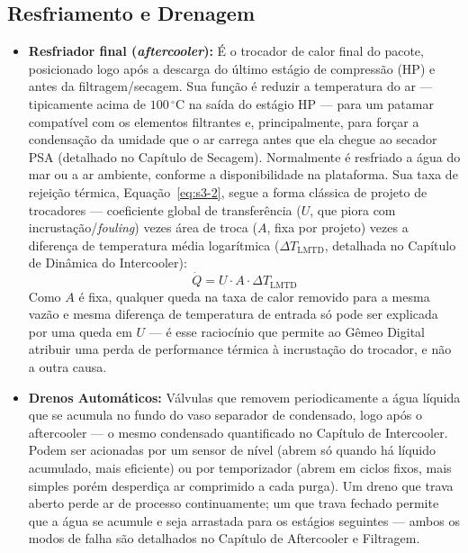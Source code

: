 \documentclass[12pt,a4paper]{article}
\numberwithin{equation}{section}
\numberwithin{table}{section}
\numberwithin{figure}{section}
\begin{document}
{	\subsection{\textbf{Resfriamento e Drenagem}}
	\begin{itemize}
		\item \textbf{Resfriador final (\textit{aftercooler}):} É o trocador de calor final do pacote, posicionado logo após a descarga do último estágio de compressão (HP) e antes da filtragem/secagem. Sua função é reduzir a temperatura do ar — tipicamente acima de $100\,^{\circ}\text{C}$ na saída do estágio HP — para um patamar compatível com os elementos filtrantes e, principalmente, para forçar a condensação da umidade que o ar carrega antes que ela chegue ao secador PSA (detalhado no Capítulo de Secagem). Normalmente é resfriado a água do mar ou a ar ambiente, conforme a disponibilidade na plataforma. Sua taxa de rejeição térmica, Equação~\eqref{eq:s3-2}, segue a forma clássica de projeto de trocadores — coeficiente global de transferência ($U$, que piora com incrustação/\textit{fouling}) vezes área de troca ($A$, fixa por projeto) vezes a diferença de temperatura média logarítmica ($\Delta T_{\text{LMTD}}$, detalhada no Capítulo de Dinâmica do Intercooler):
		\begin{equation}\label{eq:s3-2}
 \dot{Q} = U \cdot A \cdot \Delta T_{\text{LMTD}}
\end{equation}
		Como $A$ é fixa, qualquer queda na taxa de calor removido para a mesma vazão e mesma diferença de temperatura de entrada só pode ser explicada por uma queda em $U$ — é esse raciocínio que permite ao Gêmeo Digital atribuir uma perda de performance térmica à incrustação do trocador, e não a outra causa.
		\item \textbf{Drenos Automáticos:} Válvulas que removem periodicamente a água líquida que se acumula no fundo do vaso separador de condensado, logo após o aftercooler — o mesmo condensado quantificado no Capítulo de Intercooler. Podem ser acionadas por um sensor de nível (abrem só quando há líquido acumulado, mais eficiente) ou por temporizador (abrem em ciclos fixos, mais simples porém desperdiça ar comprimido a cada purga). Um dreno que trava aberto perde ar de processo continuamente; um que trava fechado permite que a água se acumule e seja arrastada para os estágios seguintes — ambos os modos de falha são detalhados no Capítulo de Aftercooler e Filtragem.
	\end{itemize}
	
}
\end{document}
